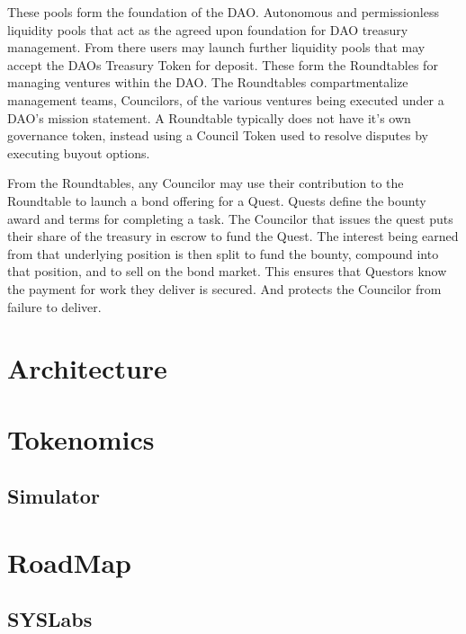 \documentclass[journal,twocolumn,12pt]{ieeesyscoin}
\begin{document}
These pools form the foundation of the DAO. Autonomous and permissionless liquidity pools that act as the agreed upon foundation for DAO treasury management. From there users may launch further liquidity pools that may accept the DAOs Treasury Token for deposit. These form the Roundtables for managing ventures within the DAO. The Roundtables compartmentalize management teams, Councilors, of the various ventures being executed under a DAO’s mission statement. A Roundtable typically does not have it’s own governance token, instead using a Council Token used to resolve disputes by executing buyout options.

From the Roundtables, any Councilor may use their contribution to the Roundtable to launch a bond offering for a Quest. Quests define the bounty award and terms for completing a task. The Councilor that issues the quest puts their share of the treasury in escrow to fund the Quest. The interest being earned from that underlying position is then split to fund the bounty, compound into that position, and to sell on the bond market. This ensures that Questors know the payment for work they deliver is secured. And protects the Councilor from failure to deliver.

\section{Architecture}
\label{sec:architecture}

\lipsum[2-4]

\section{Tokenomics}
\label{sec:tokenomics}

\lipsum[1]

\subsection{Simulator}

\lipsum[2-4]

\section{RoadMap}
\label{sec:roadmap}

\subsection{SYSLabs}

\lipsum[1]
\end{document}
